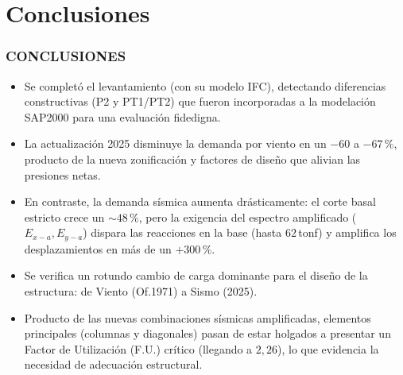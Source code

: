 \documentclass[11.5pt,aspectratio=169,handout]{beamer}
\newcommand{\ctitle}[1]{\frametitle{#1}}
\begin{document}
\section{Conclusiones}

\begin{frame}
\ctitle{CONCLUSIONES}
\vspace{2mm}
\begin{itemize}\footnotesize\setlength{\itemsep}{3mm}
  \item Se completó el \alert{levantamiento} (con su modelo IFC), detectando diferencias constructivas (P2 y PT1/PT2) que fueron incorporadas a la \alert{modelación SAP2000} para una evaluación fidedigna.
  \item La actualización 2025 \alert{disminuye la demanda por viento} en un $-60$ a $-67\,\text{\%}$, producto de la nueva zonificación y factores de diseño que alivian las presiones netas.
  \item En contraste, la \alert{demanda sísmica aumenta drásticamente}: el corte basal estricto crece un ${\sim}48\,\text{\%}$, pero la exigencia del \alert{espectro amplificado} ($E_{x-a}, E_{y-a}$) dispara las reacciones en la base (hasta $62$\,tonf) y amplifica los desplazamientos en más de un $+300\,\text{\%}$.
  \item Se verifica un rotundo \alert{cambio de carga dominante} para el diseño de la estructura: de Viento (Of.1971) a Sismo (2025).
  \item Producto de las nuevas combinaciones sísmicas amplificadas, elementos principales (columnas y diagonales) pasan de estar holgados a presentar un \alert{Factor de Utilización (F.U.) crítico} (llegando a $2{,}26$), lo que evidencia la necesidad de \alert{adecuación estructural}.
\end{itemize}
\end{frame}

\end{document}
